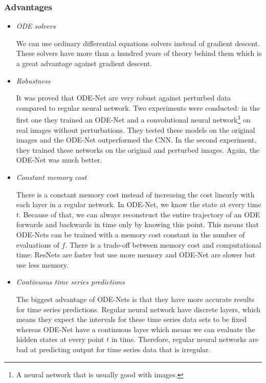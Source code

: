 \documentclass[10pt,a4paper]{article}
\theoremstyle{definition}
\theoremstyle{plain}
\begin{document}
\subsubsection*{Advantages}
\begin{itemize}
\item \textit{ODE solvers}

We can use ordinary differential equations solvers instead of gradient descent. These solvers have more than a hundred years of theory behind them which is a great advantage against gradient descent.

\item \textit{Robustness} \cite{4}

It was proved that ODE-Net are very robust against perturbed data compared to regular neural network. Two experiments were conducted: in the first one they trained an ODE-Net and a convolutional neural network\footnote{A neural network that is usually good with images.} on real images without perturbations. They tested these models on the original images and the ODE-Net outperformed the CNN. In the second experiment, they trained these networks on the original and perturbed images. Again, the ODE-Net was much better.

\item \textit{Constant memory cost}

There is a constant memory cost instead of increasing the cost linearly with each layer in a regular network. 
In ODE-Net, we know the state at every time $t$. Because of that, we can always reconstruct the entire trajectory of an ODE forwards and backwards in time only by knowing this point. This means that ODE-Nets can be trained with a memory cost constant in the number of evaluations of $f$.
There is a trade-off between memory cost and computational time: ResNets are faster but use more memory and ODE-Net are slower but use less memory.

\item \textit{Continuous time series predictions}

The biggest advantage of ODE-Nets is that they have more accurate results for time series predictions. Regular neural network have discrete layers, which means they expect the intervals for these time series data sets to be fixed whereas ODE-Net have a continuous layer which means we can evaluate the hidden states at every point $t$ in time. Therefore, regular neural networks are bad at predicting output for time series data that is irregular.
\end{itemize}
\end{document}
